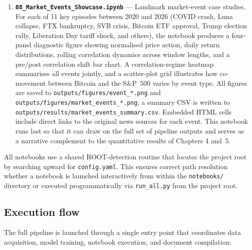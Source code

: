 \begin{enumerate}
    \item \textbf{\texttt{08\_Market\_Events\_Showcase.ipynb}} --- Landmark market-event case studies. For each of 11 key episodes between 2020 and 2026 (COVID crash, Luna collapse, FTX bankruptcy, SVB crisis, Bitcoin ETF approval, Trump election rally, Liberation Day tariff shock, and others), the notebook produces a four-panel diagnostic figure showing normalised price action, daily return distributions, rolling correlation dynamics across window lengths, and a pre/post correlation shift bar chart. A correlation-regime heatmap summarises all events jointly, and a scatter-plot grid illustrates how co-movement between Bitcoin and the S\&P~500 varies by event type. All figures are saved to \texttt{outputs/figures/event\_*.png} and \texttt{outputs/figures/market\_events\_*.png}; a summary CSV is written to \texttt{outputs/results/market\_events\_summary.csv}. Embedded HTML cells include direct links to the original news sources for each event. This notebook runs last so that it can draw on the full set of pipeline outputs and serves as a narrative complement to the quantitative results of Chapters 4 and~5.
\end{enumerate}

All notebooks use a shared ROOT-detection routine that locates the project root by searching upward for \texttt{config.yaml}. This ensures correct path resolution whether a notebook is launched interactively from within the \texttt{notebooks/} directory or executed programmatically via \texttt{run\_all.py} from the project root.

\subsection{Execution flow}

The full pipeline is launched through a single entry point that coordinates data acquisition, model training, notebook execution, and document compilation:

